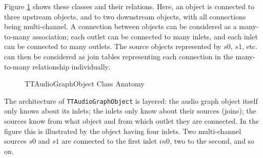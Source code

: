 \documentclass[twoside,a4paper]{article}
\begin{document}
Figure \ref{fig:anatomy} shows these classes and their relations. Here, an object is connected to three upstream objects, and to two downstream objects, with all connections being multi-channel. 
A connection between objects can be considered as a many-to-many association; each outlet can be connected to many inlets, and each inlet can be connected to many outlets. 
The source objects represented by $s0$, $s1$, etc. can then be considered as join tables representing each connection in the many-to-many relationship individually.

%
\begin{figure}[!htbp]
\centerline{}
\caption{TTAudioGraphObject Class Anatomy}
\label{fig:anatomy}
\end{figure}
%
\noindent The architecture of \texttt{TTAudioGraphObject} is layered: the audio graph object itself only knows about its inlets; the inlets only know about their sources (joins); the sources know from what object and from which outlet they are connected. 
In the figure this is illustrated by the object having four inlets. 
Two multi-channel sources $s0$ and $s1$ are connected to the first inlet $in0$, two to the second, and so on. 
\end{document}

